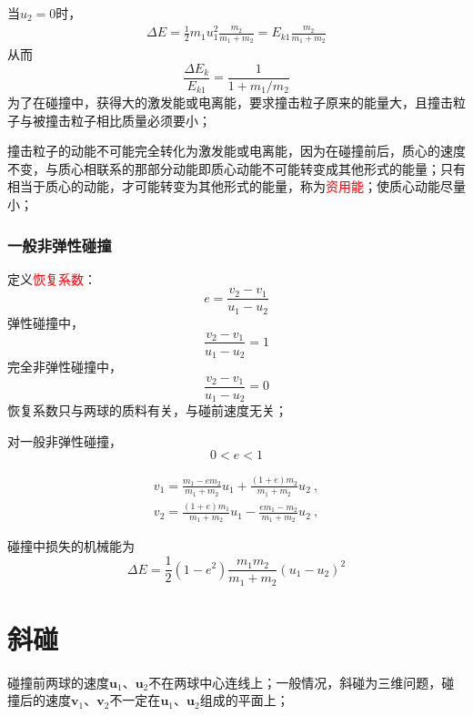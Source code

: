 \documentclass[12pt,a4paper]{article}
\renewcommand{\vec}[1]{\boldsymbol{#1}}
\begin{document}
当$u_2 = 0$时，
\begin{eqnarray}
\Delta E = \frac{1}{2} m_1 u_1^2 \frac{m_2}{m_1 +m_2} = E_{k1} \frac{m_2}{m_1 +m_2}
\end{eqnarray}
从而
\begin{equation}
\frac{\Delta E_k}{E_{k1}} = \frac{1}{1+m_1/m_2}
\end{equation}
为了在碰撞中，获得大的激发能或电离能，要求撞击粒子原来的能量大，且撞击粒子与被撞击粒子相比质量必须要小；

撞击粒子的动能不可能完全转化为激发能或电离能，因为在碰撞前后，质心的速度不变，与质心相联系的那部分动能即质心动能不可能转变成其他形式的能量；只有相当于质心的动能，才可能转变为其他形式的能量，称为\textcolor{red}{资用能}；使质心动能尽量小；

\subsubsection{一般非弹性碰撞}
定义\textcolor{red}{恢复系数}：
\begin{equation}
e = \frac{v_2 -v_1}{u_1 -u_2}
\end{equation}
弹性碰撞中，
\begin{equation}
\frac{v_2 -v_1}{u_1 -u_2} = 1
\end{equation}
完全非弹性碰撞中，
\begin{equation}
\frac{v_2 -v_1}{u_1 -u_2} = 0
\end{equation}
恢复系数只与两球的质料有关，与碰前速度无关；

对一般非弹性碰撞，
\begin{equation}
0 < e < 1
\end{equation}

\begin{eqnarray}
\nonumber v_1 = \frac{m_1 -em_2}{m_1 +m_2}u_1 +\frac{(1+e)m_2}{m_1 +m_2} u_2 ~, \\
v_2 = \frac{(1+e)m_1}{m_1 +m_2} u_1 - \frac{em_1 -m_2}{m_1 +m_2}u_2 ~,
\end{eqnarray}

碰撞中损失的机械能为
\begin{equation}
\Delta E = \frac{1}{2}(1-e^2) \frac{m_1m_2}{m_1+m_2} (u_1 -u_2)^2
\end{equation}


\section{斜碰}
碰撞前两球的速度$\vec{u}_1$、$\vec{u}_2$不在两球中心连线上；一般情况，斜碰为三维问题，碰撞后的速度$\vec{v}_1$、$\vec{v}_2$不一定在$\vec{u}_1$、$\vec{u}_2$组成的平面上；
\end{document}
